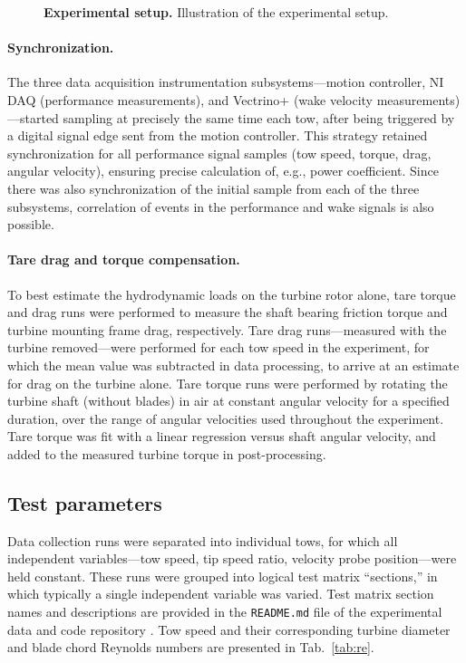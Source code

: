\documentclass[10pt,letterpaper]{article}
\begin{document}
\begin{figure}
    \centering


    \caption{{\bf Experimental setup.} Illustration of the experimental setup.}

    \label{fig:exp-setup}
\end{figure}


\paragraph{Synchronization.} The three data acquisition instrumentation
subsystems---motion controller, NI DAQ (performance measurements), and Vectrino+
(wake velocity measurements)---started sampling at precisely the same time each
tow, after being triggered by a digital signal edge sent from the motion
controller. This strategy retained synchronization for all performance signal
samples (tow speed, torque, drag, angular velocity), ensuring precise
calculation of, e.g., power coefficient. Since there was also synchronization of
the initial sample from each of the three subsystems, correlation of events in
the performance and wake signals is also possible.

\paragraph{Tare drag and torque compensation.} To best estimate the hydrodynamic
loads on the turbine rotor alone, tare torque and drag runs were performed to
measure the shaft bearing friction torque and turbine mounting frame drag,
respectively. Tare drag runs---measured with the turbine removed---were
performed for each tow speed in the experiment, for which the mean value was
subtracted in data processing, to arrive at an estimate for drag on the turbine
alone. Tare torque runs were performed by rotating the turbine shaft (without
blades) in air at constant angular velocity for a specified duration, over the
range of angular velocities used throughout the experiment. Tare torque was fit
with a linear regression versus shaft angular velocity, and added to the
measured turbine torque in post-processing.


\subsection*{Test parameters}

Data collection runs were separated into individual tows, for which all
independent variables---tow speed, tip speed ratio, velocity probe
position---were held constant. These runs were grouped into logical test matrix
``sections,'' in which typically a single independent variable was varied. Test
matrix section names and descriptions are provided in the \texttt{README.md}
file of the experimental data and code repository \cite{Bachant2016-RM2-data}.
Tow speed and their corresponding turbine diameter and blade chord Reynolds
numbers are presented in Tab.~\ref{tab:re}.
\end{document}
